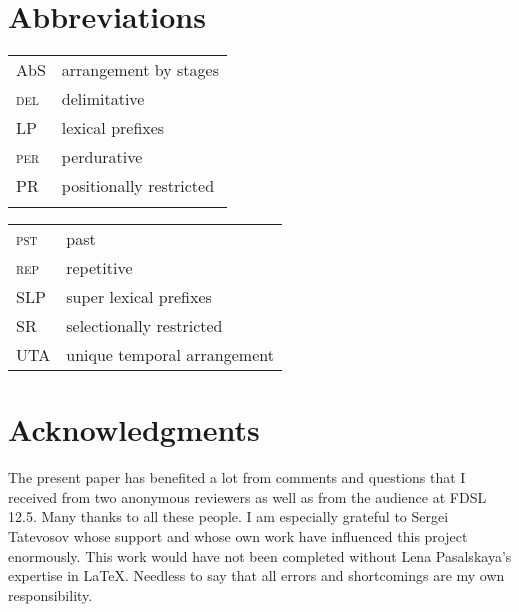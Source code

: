 \documentclass[output=paper,colorlinks,citecolor=brown,newtxmath]{langsci/langscibook}
\begin{document}
\section*{Abbreviations}
\begin{tabularx}{.45\textwidth}{lX}
{AbS} & arrangement by stages\\
\textsc{del}&{delimitative}\\
{LP}&{lexical prefixes}\\
\textsc{per}&{perdurative}\\
{PR} & {positionally restricted}\\
&\\
\end{tabularx}
\begin{tabularx}{.45\textwidth}{lX}
\textsc{pst}&past\\
\textsc{rep}&{repetitive}\\
{SLP}&{super lexical prefixes}\\
{SR} & {selectionally restricted}\\
{UTA}& {unique temporal arrangement}\\
\end{tabularx}

\section*{Acknowledgments}
The present paper has benefited a lot from comments and questions that I received from two anonymous reviewers as well as from the audience at FDSL 12.5. Many thanks to all these people. I am especially grateful to Sergei Tatevosov whose support and whose own work have influenced this project enormously. This work would have not been completed without Lena Pasalskaya's expertise in \LaTeX. Needless to say that all errors and shortcomings are my own responsibility.



\sloppy
\printbibliography[heading=subbibliography,notkeyword=this]
\end{document}
